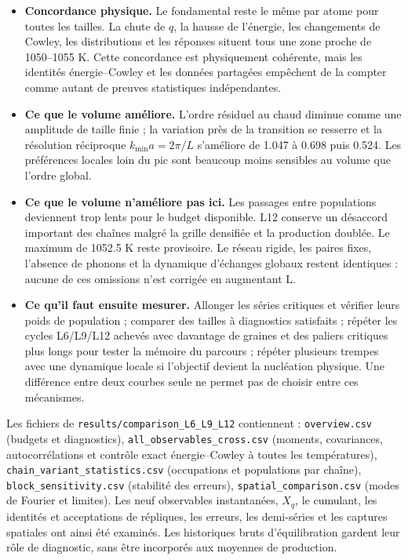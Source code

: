 \begin{itemize}

\item \textbf{Concordance physique.} Le fondamental reste le même par atome pour toutes les tailles. La chute de $q$, la hausse de l’énergie, les changements de Cowley, les distributions et les réponses situent tous une zone proche de 1050--1055 K. Cette concordance est physiquement cohérente, mais les identités énergie--Cowley et les données partagées empêchent de la compter comme autant de preuves statistiques indépendantes.

\item \textbf{Ce que le volume améliore.} L’ordre résiduel au chaud diminue comme une amplitude de taille finie ; la variation près de la transition se resserre et la résolution réciproque $k_{\min}a=2\pi/L$ s’améliore de 1.047 à 0.698 puis 0.524. Les préférences locales loin du pic sont beaucoup moins sensibles au volume que l’ordre global.

\item \textbf{Ce que le volume n’améliore pas ici.} Les passages entre populations deviennent trop lents pour le budget disponible. L12 conserve un désaccord important des chaînes malgré la grille densifiée et la production doublée. Le maximum de 1052.5 K reste provisoire. Le réseau rigide, les paires fixes, l’absence de phonons et la dynamique d’échanges globaux restent identiques : aucune de ces omissions n’est corrigée en augmentant L.

\item \textbf{Ce qu’il faut ensuite mesurer.} Allonger les séries critiques et vérifier leurs poids de population ; comparer des tailles à diagnostics satisfaits ; répéter les cycles L6/L9/L12 achevés avec davantage de graines et des paliers critiques plus longs pour tester la mémoire du parcours ; répéter plusieurs trempes avec une dynamique locale si l’objectif devient la nucléation physique. Une différence entre deux courbes seule ne permet pas de choisir entre ces mécanismes.

\end{itemize}

{\raggedright Les fichiers de \texttt{results/comparison\_L6\_L9\_L12} contiennent : \texttt{overview.csv} (budgets et diagnostics), \texttt{all\_observables\_cross.csv} (moments, covariances, autocorrélations et contrôle exact énergie--Cowley à toutes les températures), \texttt{chain\_variant\_statistics.csv} (occupations et populations par chaîne), \texttt{block\_sensitivity.csv} (stabilité des erreurs), \texttt{spatial\_comparison.csv} (modes de Fourier et limites). Les neuf observables instantanées, $X_q$, le cumulant, les identités et acceptations de répliques, les erreurs, les demi-séries et les captures spatiales ont ainsi été examinés. Les historiques bruts d’équilibration gardent leur rôle de diagnostic, sans être incorporés aux moyennes de production.\par}

